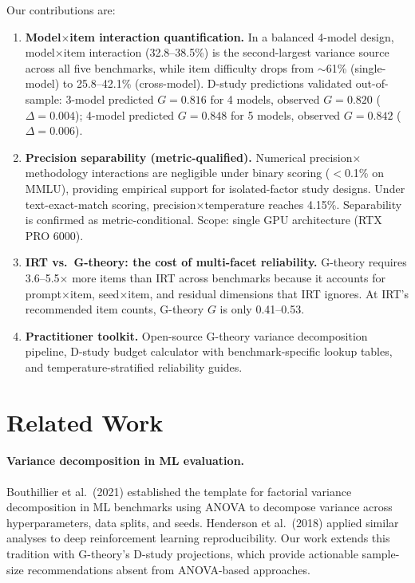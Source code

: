 \documentclass[11pt]{article}
\begin{document}
Our contributions are:
\begin{enumerate}
\item \textbf{Model$\times$item interaction quantification.}
In a balanced 4-model design, model$\times$item interaction (32.8--38.5\%) is the second-largest variance source across all five benchmarks, while item difficulty drops from $\sim$61\% (single-model) to 25.8--42.1\% (cross-model). D-study predictions validated out-of-sample: 3-model predicted $G=0.816$ for 4 models, observed $G=0.820$ ($\Delta=0.004$); 4-model predicted $G=0.848$ for 5 models, observed $G=0.842$ ($\Delta=0.006$).

\item \textbf{Precision separability (metric-qualified).}
Numerical precision$\times$methodology interactions are negligible under binary scoring ($<$0.1\% on MMLU), providing empirical support for isolated-factor study designs. Under text-exact-match scoring, precision$\times$temperature reaches 4.15\%. Separability is confirmed as metric-conditional. Scope: single GPU architecture (RTX PRO 6000).

\item \textbf{IRT vs.\ G-theory: the cost of multi-facet reliability.}
G-theory requires 3.6--5.5$\times$ more items than IRT across benchmarks because it accounts for prompt$\times$item, seed$\times$item, and residual dimensions that IRT ignores. At IRT's recommended item counts, G-theory $G$ is only 0.41--0.53.

\item \textbf{Practitioner toolkit.}
Open-source G-theory variance decomposition pipeline, D-study budget calculator with benchmark-specific lookup tables, and temperature-stratified reliability guides.
\end{enumerate}

\section{Related Work}
\label{sec:related}

\paragraph{Variance decomposition in ML evaluation.}
Bouthillier et al.\ (2021) established the template for factorial variance decomposition in ML benchmarks using ANOVA to decompose variance across hyperparameters, data splits, and seeds.
Henderson et al.\ (2018) applied similar analyses to deep reinforcement learning reproducibility.
Our work extends this tradition with G-theory's D-study projections, which provide actionable sample-size recommendations absent from ANOVA-based approaches.
\end{document}
